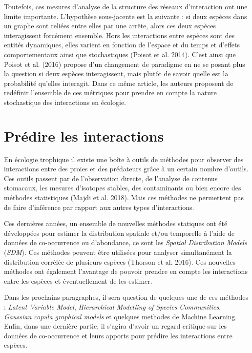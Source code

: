 \documentclass[
  12pt,
  a4paper,
  oneside]{report}
\begin{document}
Toutefois, ces mesures d'analyse de la structure des réseaux
d'interaction ont une limite importante. L'hypothèse sous-jacente est la
suivante : si deux espèces dans un graphe sont reliées entre elles par
une arrête, alors ces deux espèces interagissent forcément ensemble.
Hors les interactions entre espèces sont des entités dynamiques, elles
varient en fonction de l'espace et du temps et d'effets comportementaux
ainsi que stochastiques (Poisot et al. 2014). C'est ainsi que Poisot et
al. (2016) propose d'un changement de paradigme en ne se posant plus la
question si deux espèces interagissent, mais plutôt de savoir quelle est
la probabilité qu'elles interagit. Dans ce même article, les auteurs
proposent de redéfinir l'ensemble de ces métriques pour prendre en
compte la nature stochastique des interactions en écologie.

\hypertarget{pruxe9dire-les-interactions}{%
\chapter{Prédire les interactions}\label{pruxe9dire-les-interactions}}

En écologie trophique il existe une boîte à outils de méthodes pour
observer des interactions entre des proies et des prédateurs grâce à un
certain nombre d'outils. Ces outils passent par de l'observation
directe, de l'analyse de contenus stomacaux, les mesures d'isotopes
stables, des contaminants ou bien encore des méthodes statistiques
(Majdi et al. 2018). Mais ces méthodes ne permettent pas de faire
d'inférence par rapport aux autres types d'interactions.

Ces dernières années, un ensemble de nouvelles méthodes statiques ont
été développées pour estimer la distribution spatiale et/ou temporelle à
l'aide de données de co-occurrence ou d'abondance, ce sont les
\emph{Spatial Distribution Models} (\emph{SDM}). Ces méthodes peuvent
être utilisées pour analyser simultanément la distribution corrélée de
plusieurs espèces (Thorson et al. 2016). Ces nouvelles méthodes ont
également l'avantage de pouvoir prendre en compte les interactions entre
les espèces et éventuellement de les estimer.

Dans les prochains paragraphes, il sera question de quelques une de ces
méthodes : \emph{Latent Variable Model}, \emph{Hierarchical Modelling of
Species Communities}, \emph{Gaussian copula graphical models} et
quelques methodes de Machine Learning. Enfin, dans une dernière partie,
il s'agira d'avoir un regard critique sur les données de co-occurrence
et leurs apports pour prédire les interactions entre espèces.
\end{document}
